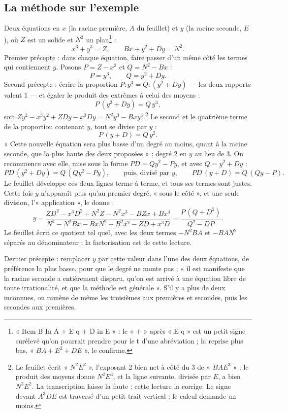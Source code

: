 \documentclass[11pt,a4paper]{article}
\begin{document}
\subsection*{La méthode sur l'exemple}

Deux équations en $x$ (la racine première, $A$ du feuillet) et $y$ (la racine
seconde, $E$), où $Z$ est un solide et $N^2$ un plan\footnote{« Item B In A
$+$ E q $+$ D in E » : le « $+$ » après « E q » est un petit signe surélevé
qu'on pourrait prendre pour le t d'une abréviation ; la reprise plus bas,
« $BA + E^2 + DE$ », le confirme.} :
\[ x^3 + y^3 = Z, \qquad Bx + y^2 + Dy = N^2 . \]
Premier précepte : dans chaque équation, faire passer d'un même côté les termes qui
contiennent $y$. Posons $P = Z - x^3$ et $Q = N^2 - Bx$ :
\[ P = y^3, \qquad Q = y^2 + Dy . \]
Second précepte : écrire la proportion $P : y^3 = Q : (y^2 + Dy)$ — les deux
rapports valent $1$ — et égaler le produit des extrêmes à celui des moyens :
\[ P\,(y^2 + Dy) = Q\,y^3 , \]
soit $Zy^2 - x^3y^2 + ZDy - x^3Dy = N^2y^3 - Bxy^3$.\footnote{Le feuillet
écrit « $N^2E^2$ », l'exposant 2 bien net à côté du 3 de « $BAE^3$ » : le
produit des moyens donne $N^2E^3$, et la ligne suivante, divisée par $E$, a
bien $N^2E^2$. La transcription laisse la faute ; cette lecture la corrige. Le
signe devant $A^3DE$ est traversé d'un petit trait vertical ; le calcul demande
un moins.} Le second et le quatrième terme de la proportion contenant $y$, tout
se divise par $y$ :
\[ P\,(y + D) = Q\,y^2 . \]
« Cette nouvelle équation sera plus basse d'un degré au moins, quant à la
racine seconde, que la plus haute des deux proposées » : degré 2 en $y$ au lieu
de 3. On recommence avec elle, mise sous la forme $PD = Qy^2 - Py$, et avec
$Q = y^2 + Dy$ :
\[ PD\,(y^2 + Dy) = Q\,(Qy^2 - Py) ,
   \qquad\text{puis, divisé par } y, \qquad
   PD\,(y + D) = Q\,(Qy - P) . \]
Le feuillet développe ces deux lignes terme à terme, et tous ses termes sont
justes. Cette fois $y$ n'apparaît plus qu'au premier degré, « sous le côté », et
une seule division, l'« application », le donne :
\[ y = \frac{ZD^2 - x^3D^2 + N^2Z - N^2x^3 - BZx + Bx^4}
            {N^4 - N^2Bx - BxN^2 + B^2x^2 - ZD + x^3D}
     = \frac{P\,(Q + D^2)}{Q^2 - DP} . \]
Le feuillet écrit ce quotient tel quel, avec les deux termes $-N^2BA$ et
$-BAN^2$ séparés au dénominateur ; la factorisation est de cette lecture.

Dernier précepte : remplacer $y$ par cette valeur dans l'une des deux
équations, de préférence la plus basse, pour que le degré ne monte pas ;
« il est manifeste que la racine seconde a entièrement disparu, qu'on est
arrivé à une équation libre de toute irrationalité, et que la méthode est
générale ». S'il y a plus de deux inconnues, on ramène de même les troisièmes
aux premières et secondes, puis les secondes aux premières.
\end{document}
